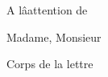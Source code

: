 \documentclass[10pt]{lettre}
\begin{document}
\begin{letter}{A lâattention de} %

\signature{PrÃ©nom \textsc{Nom}}
\address{PrÃ©nom \textsc{Nom}\\Adresse}
\nofax %


\opening{Madame, Monsieur} %

 Corps de la lettre
  
\end{letter}
\end{document}
